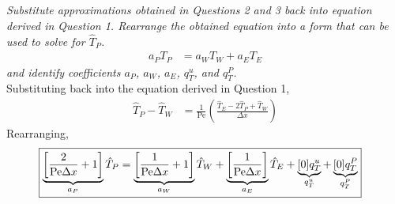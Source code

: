 \section{}
\textit{Substitute approximations obtained in Questions 2 and 3 back into equation derived in Question 1. Rearrange the obtained equation into a form that can be used to solve for $\hat{T}_P$.}
\begin{align*}
    a_P T_P &= a_W T_W + a_E T_E 
\end{align*}
\textit{and identify coefficients $a_P$, $a_W$, $a_E$, $q_{T}^{u}$, and $q_{T}^{P}$.} \\

Substituting back into the equation derived in Question 1,
\begin{align*}
    \hat{T}_P - \hat{T}_W &= \frac{1}{\text{Pe}} \left(\frac{\hat{T}_E - 2\hat{T}_P + \hat{T}_W}{\Delta x}\right) 
\end{align*}
Rearranging,
\begin{align*}
    \Aboxed{\underbrace{\left[\frac{2}{\text{Pe}\Delta x} + 1\right]}_{a_P}\hat{T}_P &= \underbrace{\left[\frac{1}{\text{Pe}\Delta x} + 1\right]}_{a_W}\hat{T}_W + \underbrace{\left[\frac{1}{\text{Pe}\Delta x}\right]}_{a_E}\hat{T}_E + \underbrace{[0] q_{T}^{u}}_{q_{T}^{u}} + \underbrace{[0] q_{T}^{P}}_{q_{T}^{P}}}
\end{align*}
